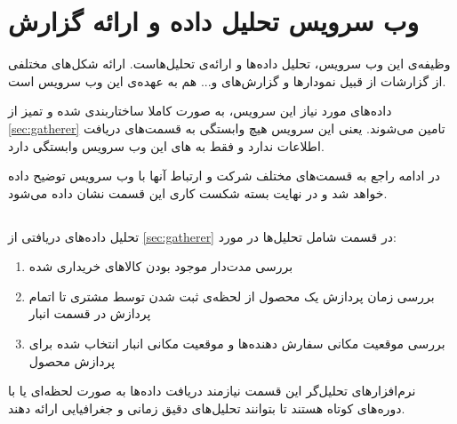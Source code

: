 \section{وب سرویس تحلیل داده و ارائه گزارش}\label{sec:processor}
وظیفه‌ی این وب‌ سرویس، تحلیل‌ داده‌ها و ارائه‌ی تحلیل‌هاست. ارائه شکل‌‌های مختلفی از گزارشات از قبیل نمودار‌ها و گزارش‌های 
و... هم به عهده‌ی این وب سرویس است.

داده‌های مورد نیاز این سرویس، به صورت کاملا ساختاربندی شده و تمیز از
\ref{sec:gatherer}
تامین می‌شوند. یعنی این سرویس هیچ وابستگی به قسمت‌های دریافت اطلاعات  ندارد و فقط به ‌های این وب سرویس وابستگی دارد.

در ادامه راجع به قسمت‌های مختلف شرکت و ارتباط آنها با وب سرویس توضیح داده خواهد شد و در نهایت بسته شکست کاری این قسمت نشان داده می‌شود.

\subsection{}\label{second-web-service:stock}
تحلیل‌ داده‌های دریافتی از 
\ref{sec:gatherer}
در قسمت 
شامل تحلیل‌ها در مورد:
\begin{enumerate}
\item\label{1}
بررسی مدت‌‌دار موجود بودن کالا‌های خریداری شده

\item\label{2}
بررسی زمان پردازش یک محصول از لحظه‌ی ثبت شدن توسط مشتری تا اتمام پردازش در قسمت انبار

\item\label{3}
بررسی موقعیت مکانی سفارش دهنده‌ها و موقعیت مکانی انبار انتخاب شده برای پردازش محصول

\end{enumerate}

نرم‌افزار‌های تحلیل‌گر این قسمت نیازمند دریافت داده‌ها به صورت لحظه‌ای یا با دوره‌های کوتاه هستند تا بتوانند تحلیل‌های دقیق زمانی و جغرافیایی ارائه دهند.

\subsection{}\label{second-web-service:site}

